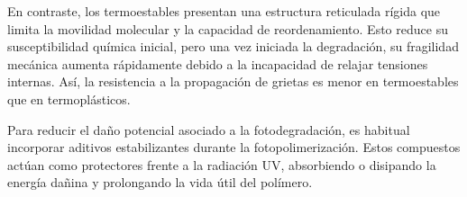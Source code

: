 En contraste, los termoestables presentan una estructura reticulada rígida que limita la movilidad molecular y la capacidad de reordenamiento. Esto reduce su susceptibilidad química inicial, pero una vez iniciada la degradación, su fragilidad mecánica aumenta rápidamente debido a la incapacidad de relajar tensiones internas. Así, la resistencia a la propagación de grietas es menor en termoestables que en termoplásticos.

Para reducir el daño potencial asociado a la fotodegradación, es habitual incorporar aditivos estabilizantes durante la fotopolimerización. Estos compuestos actúan como protectores frente a la radiación UV, absorbiendo o disipando la energía dañina y prolongando la vida útil del polímero.